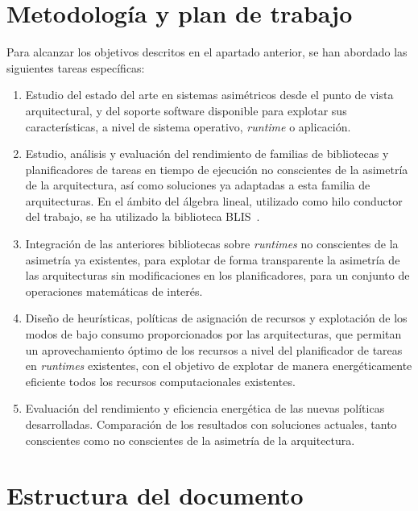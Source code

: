 \section{Metodología y plan de trabajo}
Para alcanzar los objetivos descritos en el apartado anterior, se han
abordado las siguientes tareas específicas:
\begin{enumerate}[T1.]
\item Estudio del estado del arte en sistemas asimétricos desde el punto de
  vista arquitectural, y del soporte software disponible para explotar sus
  características, a nivel de sistema operativo, \emph{runtime} o
  aplicación.
\item Estudio, análisis y evaluación del rendimiento de familias de
  bibliotecas y planificadores de tareas en tiempo de ejecución no
  conscientes de la asimetría de la arquitectura, así como soluciones ya
  adaptadas a esta familia de arquitecturas. En el ámbito del álgebra
  lineal, utilizado como hilo conductor del trabajo, se ha utilizado la
  biblioteca BLIS~\cite{BLIS1}.
\item Integración de las anteriores bibliotecas sobre \emph{runtimes} no
  conscientes de la asimetría ya existentes, para explotar de forma
  transparente la asimetría de las arquitecturas sin modificaciones en los
  planificadores, para un conjunto de operaciones matemáticas de interés.
\item Diseño de heurísticas, políticas de asignación de recursos y
  explotación de los modos de bajo consumo proporcionados por las
  arquitecturas, que permitan un aprovechamiento óptimo de los recursos a
  nivel del planificador de tareas en \emph{runtimes} existentes, con el
  objetivo de explotar de manera energéticamente eficiente todos los
  recursos computacionales existentes.
\item Evaluación del rendimiento y eficiencia energética de las nuevas
  políticas desarrolladas. Comparación de los resultados con soluciones
  actuales, tanto conscientes como no conscientes de la asimetría de la
  arquitectura.
\end{enumerate}

\section{Estructura del documento}

